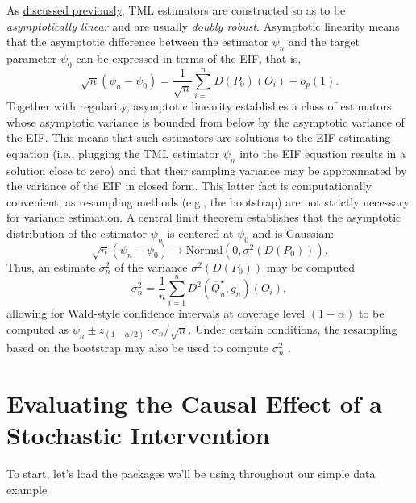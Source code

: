 \documentclass[
  12pt, krantz2,
]{krantz}
\newcommand{\1}{\mathbbm{1}}
\theoremstyle{definition}
\theoremstyle{definition}
\theoremstyle{definition}
\theoremstyle{definition}
\theoremstyle{remark}
\begin{document}
As \protect\hyperlink{tmle3}{discussed previously}, TML estimators are constructed so as to be
\emph{asymptotically linear} and are usually \emph{doubly robust}. Asymptotic linearity
means that the asymptotic difference between the estimator \(\psi_n\) and the
target parameter \(\psi_0\) can be expressed in terms of the EIF, that is,
\begin{equation}
  \sqrt{n}(\psi_n - \psi_0) = \frac{1}{\sqrt{n}}\sum_{i=1}^n D(P_0)(O_i) +
    o_p(1).
  \label{eq:asymplin-shift}
\end{equation}
Together with regularity, asymptotic linearity establishes a class of estimators
whose asymptotic variance is bounded from below by the asymptotic variance of
the EIF. This means that such estimators are solutions to the EIF estimating
equation (i.e., plugging the TML estimator \(\psi_n\) into the EIF equation
results in a solution close to zero) and that their sampling variance may be
approximated by the variance of the EIF in closed form. This latter fact is
computationally convenient, as resampling methods (e.g., the bootstrap) are not
strictly necessary for variance estimation. A central limit theorem establishes
that the asymptotic distribution of the estimator \(\psi_n\) is centered at
\(\psi_0\) and is Gaussian:
\begin{equation}
  \sqrt{n}(\psi_n - \psi_0) \to \text{Normal}(0, \sigma^2(D(P_0))).
  \label{eq:tmle-gaussian-shift}
\end{equation}
Thus, an estimate \(\sigma_n^2\) of the variance \(\sigma^2(D(P_0))\) may be
computed
\begin{equation}
  \sigma_n^2 = \frac{1}{n} \sum_{i = 1}^{n} D^2(\overline{Q}_n^{\star},
  g_n)(O_i),
  \label{eq:eif-var-shift}
\end{equation}
allowing for Wald-style confidence intervals at coverage level \((1 - \alpha)\) to
be computed as \(\psi_n \pm z_{(1 - \alpha/2)} \cdot \sigma_n / \sqrt{n}\). Under
certain conditions, the resampling based on the bootstrap may also be used to
compute \(\sigma_n^2\) \citep{vdl2011targeted}.

\hypertarget{evaluating-the-causal-effect-of-a-stochastic-intervention}{%
\section{Evaluating the Causal Effect of a Stochastic Intervention}\label{evaluating-the-causal-effect-of-a-stochastic-intervention}}

To start, let's load the packages we'll be using throughout our simple data example
\end{document}
